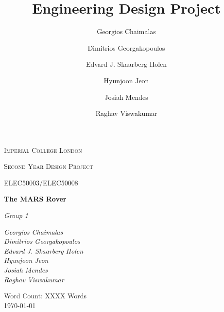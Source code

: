 \documentclass[a4paper]{article}
\title{Engineering Design Project}
\author{Georgios Chaimalas \and 
        Dimitrios Georgakopoulos \and 
        Edvard J. Skaarberg Holen \and 
        Hyunjoon Jeon \and 
        Josiah Mendes \and 
        Raghav Viswakumar}
\begin{document}
 
\begin{titlepage}
    \setlength{\headheight}{66.89pt}
    \thispagestyle{fancy}
    \renewcommand{\headrulewidth}{0pt}
    \renewcommand{\footrulewidth}{0pt}
    \cfoot{} %
    \hbox{}\vfill
    \begin{center} 
	    {\scshape\LARGE Imperial College London  \par}
	    \vspace{1cm}
        {\scshape\Large Second Year Design Project\par}
        \vspace{0.25cm}
        {\scshape\Large ELEC50003/ELEC50008\par}
        \vspace{1.5cm}
        {\huge\bfseries The MARS Rover\par}
        \vspace{2cm}
        {\Large\itshape Group 1\par}
        \vfill
        \begin{flushright}
            \textsl{ \large
            Georgios Chaimalas \\ 
            Dimitrios Georgakopoulos \\ 
            Edvard J. Skaarberg Holen \\ 
            Hyunjoon Jeon \\ 
            Josiah Mendes \\ 
            Raghav Viswakumar
            }
        \end{flushright}
        \vfill

        {\large Word Count: XXXX Words \\ \today\par}
        \vfill
    \end{center}
\end{titlepage}
 
\setcounter{tocdepth}{2}
\tableofcontents
\end{document}

